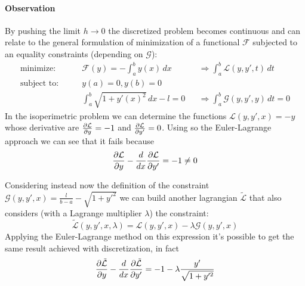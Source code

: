 	\paragraph{Observation} By pushing the limit $h\rightarrow 0$ the discretized problem becomes continuous and can relate to the general formulation of minimization of a functional $\mathcal F$ subjected to an equality constraints (depending on $\mathcal G$):
	\begin{align*}
		\textrm{minimize:} \qquad & \mathcal F(y) = - \int_a^b y(x)\, dx && \Rightarrow \int_a^b \mathcal L(y,y',t)\,dt \\
		\textrm{subject to:} \qquad & y(a) = 0 , y(b) = 0\\ & \int_a^b \sqrt{1+y'(x)^2}\, dx - l = 0 && \Rightarrow \int_a^b \mathcal G(y,y',y)\, dt = 0
	\end{align*}
	In the isoperimetric problem we can determine the functions $\mathcal L(y,y',x) = -y$ whose derivative are $\frac{\partial \mathcal L}{\partial y} = -1$ and $\frac{\partial \mathcal L}{\partial y'} = 0$. Using so the Euler-Lagrange approach we can see that it fails because
	\[ \frac{\partial \mathcal L}{\partial y } - \frac{d}{dx} \frac{\partial \mathcal L}{\partial y'} = - 1 \neq 0 \]
	
	Considering instead now the definition of the constraint $\mathcal G(y,y',x) = \frac{l}{b-a} - \sqrt{1 + y'^2}$ we can build another lagrangian $\tilde{\mathcal L}$ that also considers (with a Lagrange multiplier $\lambda$) the constraint:
	\[ \tilde{\mathcal L}(y,y',x,\lambda) = \mathcal L(y,y',x) - \lambda \mathcal G(y,y',x) \]
	Applying the Euler-Lagrange method on this expression it's possible to get the same result achieved with discretization, in fact
	\[ \frac{\partial \tilde{\mathcal L}}{\partial y} - \frac{d}{dx} \frac{\partial \tilde{\mathcal L}}{\partial y'} = - 1 - \lambda \frac{y'}{\sqrt{1 + y'^2}} \]
	
